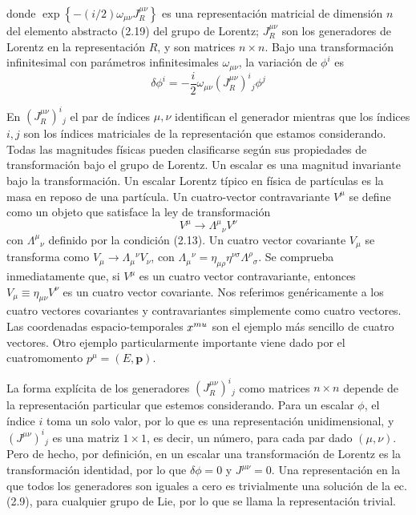           donde $\exp \left\{-(i / 2) \omega_{\mu \nu} J_{R}^{\mu \nu}\right\}$ es una representación matricial de dimensión $n$ del elemento abstracto (2.19) del grupo de Lorentz; $J_{R}^{\mu \nu}$ son los generadores de Lorentz en la representación $R$, y son matrices $n \times n$. Bajo una transformación infinitesimal con parámetros infinitesimales $\omega_{\mu \nu}$, la variación de $\phi^{i}$ es
          \begin{equation*}
            \delta \phi^{i}=-\frac{i}{2} \omega_{\mu \nu}\left(J_{R}^{\mu \nu}\right)^{i}{ }_{j} \phi^{j} \tag{2.21}
            \end{equation*}

            En $\left(J_{R}^{\mu \nu}\right)^{i}{ }_{j}$ el par de índices $\mu, \nu$ identifican el generador mientras que los índices $i, j$ son los índices matriciales de la representación que estamos considerando. Todas las magnitudes físicas pueden clasificarse según sus propiedades de transformación bajo el grupo de Lorentz. Un escalar es una magnitud invariante bajo la transformación. Un escalar Lorentz típico en física de partículas es la masa en reposo de una partícula. Un cuatro-vector contravariante $V^{\mu}$ se define como un objeto que satisface la ley de transformación
            \begin{equation*}
              V^{\mu} \rightarrow \Lambda^{\mu}{ }_{\nu} V^{\nu} \tag{2.22}
              \end{equation*}
              con $\Lambda^{\mu}{ }_{\nu}$ definido por la condición (2.13). Un cuatro vector covariante $V_{\mu}$ se transforma como $V_{\mu} \rightarrow \Lambda_{\mu}{ }^{\nu} V_{\nu}$, con $\Lambda_{\mu}{ }^{\nu}=\eta_{\mu \rho} \eta^{\nu \sigma} \Lambda^{\rho}{ }_{\sigma}$. Se comprueba inmediatamente que, si $V^{\mu}$ es un cuatro vector contravariante, entonces $V_{\mu} \equiv \eta_{\mu \nu} V^{\nu}$ es un cuatro vector covariante. Nos referimos genéricamente a los cuatro vectores covariantes y contravariantes simplemente como cuatro vectores. Las coordenadas espacio-temporales $x^{\\mu}$ son el ejemplo más sencillo de cuatro vectores. Otro ejemplo particularmente importante viene dado por el cuatromomento $p^{\mu}=(E, \mathbf{p})$.

La forma explícita de los generadores $\left(J_{R}^{\mu \nu}\right)^{i}{ }_{j}$ como matrices $n \times n$ depende de la representación particular que estemos considerando. Para un escalar $\phi$, el índice $i$ toma un solo valor, por lo que es una representación unidimensional, y $\left(J^{\mu \nu}\right)^{i}{ }_{j}$ es una matriz $1 \times 1$, es decir, un número, para cada par dado $(\mu, \nu)$. Pero de hecho, por definición, en un escalar una transformación de Lorentz es la transformación identidad, por lo que $\delta \phi=0$ y $J^{\mu \nu}=0$. Una representación en la que todos los generadores son iguales a cero es trivialmente una solución de la ec. (2.9), para cualquier grupo de Lie, por lo que se llama la representación trivial.

